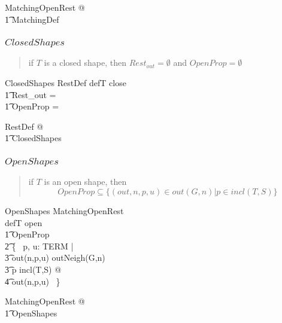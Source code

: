 \documentclass{article}
\begin{document}
\begin{zed}
	\forall MatchingOpenRest @ \\
\t1		MatchingDef
\end{zed}

\subsubsection{$ClosedShapes$}
\begin{quote}
if $T$ is a closed shape, then $Rest_{out} = \emptyset$ and $OpenProp = \emptyset$
\end{quote}
\begin{schema}{ClosedShapes}
	RestDef
\where
	defT \in \ran close \implies \\
\t1		Rest\_out = \emptyset \land \\
\t1		OpenProp = \emptyset
\end{schema}

\begin{zed}
	\forall RestDef @ \\
\t1		ClosedShapes
\end{zed}

\subsubsection{$OpenShapes$}
\begin{quote}
if $T$ is an open shape, then 
\[
OpenProp \subseteq \{(out, n, p, u) \in out(G, n) | p \in incl(T, S)\}
\]
\end{quote}
\begin{schema}{OpenShapes}
	MatchingOpenRest \\
\where
	defT \in \ran open \implies \\
\t1		OpenProp \subseteq \\
\t2			\{~ p, u: TERM | \\
\t3				out(n,p,u) \in outNeigh(G,n) \land \\
\t3				p \in incl(T,S) @ \\
\t4					out(n,p,u) ~\}
\end{schema}

\begin{zed}
	\forall MatchingOpenRest @ \\
\t1		OpenShapes
\end{zed}
\end{document}
